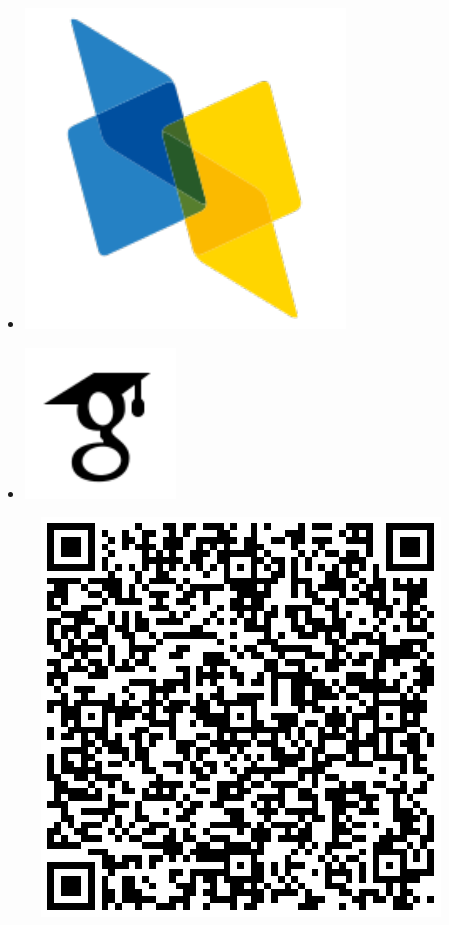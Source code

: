 \documentclass[a4paper,oneside,10pt]{article}
\begin{document}
\begin{multicols}{9}
\begin{itemize}
\item[]\href{https://dblp.uni-trier.de/pers/hd/a/Angelidis:Iosif}{\includegraphics[scale=0.15]{assets/dblp.pdf}}

\item[]\href{https://scholar.google.gr/citations?user=r8jJLocAAAAJ&hl=en}{\includegraphics[scale=0.3]{assets/icons8-google-scholar.pdf}}

\end{itemize}
\end{multicols}

\vspace{30mm}

\begin{figure}[hbt!]
	\centering
	\includegraphics[scale=0.5]{qrcode.png}%
\end{figure}
\end{document}
